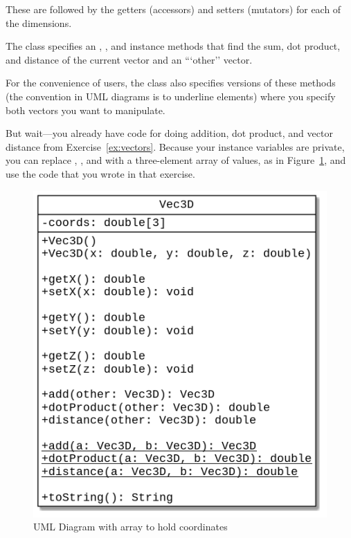 \begin{exercise}
These are followed by the getters (accessors) and setters (mutators) for each of the dimensions. 

The class specifies an , , and  instance methods that find the sum, dot product, and distance of the current vector and an ```other'' vector.

For the convenience of users, the class also specifies  versions of these methods (the convention in UML diagrams is to underline  elements) where you specify both vectors you want to manipulate.


But wait---you already have code for doing addition, dot product, and vector distance from Exercise~\ref{ex:vectors}. Because your instance variables are private, you can replace , , and  with a three-element array of  values, as in Figure~\ref{fig.vec3d_b}, and use the code that you wrote in that exercise.

\begin{figure}[!h]
\begin{center}
\includegraphics[scale=0.5]{figs/ch11/vec3d_b.png}
\caption{UML Diagram with array to hold coordinates}
\label{fig.vec3d_b}
\end{center}
\end{figure}


\end{exercise}
